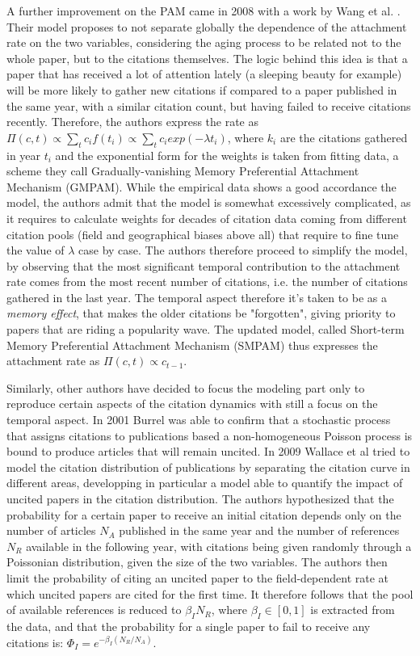 A further improvement on the PAM came in 2008 with a work by Wang et al. \cite{Wang20084692}. Their model proposes to not separate globally the dependence of the attachment rate on the two variables, considering the aging
process to be related not to the whole paper, but to the citations themselves. The logic behind this idea is that a paper that has received a lot of attention lately (a sleeping beauty for example) will be more likely
to gather new citations if compared to a paper published in the same year, with a similar citation count, but having failed to receive citations recently. Therefore, the authors express the rate as $\Pi(c,t)  \propto \sum_{t} c_{i}f(t_{i}) \propto  \sum_{t} c_{i}exp(-\lambda t_{i}) $,
where $k_{i}$ are the citations gathered in year $t_{i}$ and the exponential form for the weights is taken from fitting data, a scheme they call Gradually-vanishing Memory Preferential Attachment Mechanism (GMPAM). 
While the empirical data shows a good accordance the model, the authors admit that the model is somewhat excessively complicated, as it requires to calculate weights for decades of citation data coming from
  different citation pools (field and geographical biases above all) that require to fine tune the value of $\lambda$ case by case. The authors therefore proceed to simplify the model, by observing that the most 
  significant temporal contribution to the attachment rate comes from the most recent number of citations, i.e. the number of citations gathered in the last year. The temporal aspect therefore it's taken to be
  as a \textit{memory effect}, that makes the older citations be "forgotten", giving priority to papers that are riding a popularity wave. The updated model, called Short-term Memory Preferential Attachment Mechanism (SMPAM) thus expresses
  the attachment rate as $\Pi(c,t) \propto c_{t-1}$. 

Similarly, other authors have decided to focus the modeling part only to reproduce certain aspects of the citation dynamics with still a focus on the temporal aspect.
In 2001 Burrel was able to confirm that a stochastic process that assigns citations to publications 
based a non-homogeneous Poisson process \cite{Burrel2001} is bound to produce articles that will remain uncited. In 2009 Wallace et al \cite{Wallace2009296} tried to model the citation distribution of publications by separating the citation curve in different areas, developping in particular a model able to quantify the impact
of uncited papers in the citation distribution. The authors hypothesized that the probability for a certain paper to receive an initial citation depends only on the number of articles $N_{A}$ published in the same year
 and the number of references $N_{R}$ available in the following year, with citations being given randomly through a Poissonian distribution, given the size of the two variables. The authors then limit the 
 probability of citing an uncited paper to the field-dependent rate at which uncited papers are cited for the first time. It therefore follows that the pool of available references is reduced to $\beta_{I}N_{R}$, where $\beta_{I} \in [0,1]$ is extracted
 from the data, and that the probability for a single paper to fail to receive any citations is:
$\Phi_{I} = e^{-\beta_{I} (N_{R}/N_{A}) }$. 

